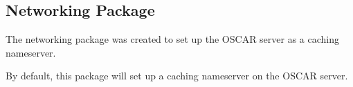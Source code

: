 %
%
% 
% 
% 
% 
%

\subsection{Networking Package}
\label{app:networking-overview}


The networking package was created to set up the OSCAR server as a caching 
nameserver. %

By default, this package will set up a caching nameserver on the OSCAR server.
